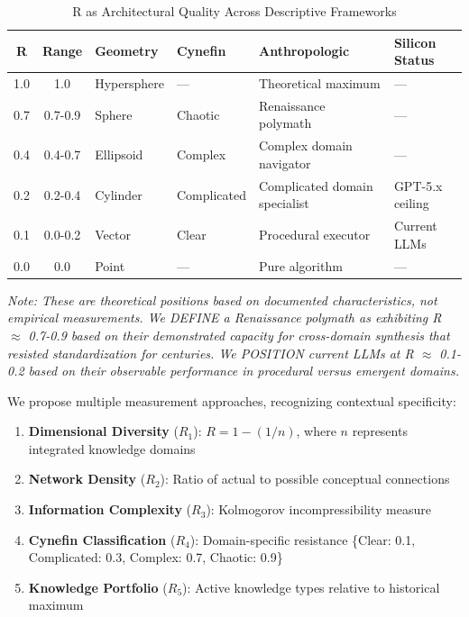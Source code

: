 \begin{table}[h]
\centering
\caption{R as Architectural Quality Across Descriptive Frameworks}
\begin{tabular}{|c|c|l|l|l|l|}
\hline
\textbf{R} & \textbf{Range} & \textbf{Geometry} & \textbf{Cynefin} & \textbf{Anthropologic} & \textbf{Silicon Status} \\
\hline
1.0 & 1.0 & Hypersphere & --- & Theoretical maximum & --- \\
0.7 & 0.7-0.9 & Sphere & Chaotic & Renaissance polymath & --- \\
0.4 & 0.4-0.7 & Ellipsoid & Complex & Complex domain navigator & --- \\
0.2 & 0.2-0.4 & Cylinder & Complicated & Complicated domain specialist & GPT-5.x ceiling \\
0.1 & 0.0-0.2 & Vector & Clear & Procedural executor & Current LLMs \\
0.0 & 0.0 & Point & --- & Pure algorithm & --- \\
\hline
\end{tabular}
\end{table}

\textit{Note: These are theoretical positions based on documented characteristics, not empirical measurements. We DEFINE a Renaissance polymath as exhibiting R $\approx$ 0.7-0.9 based on their demonstrated capacity for cross-domain synthesis that resisted standardization for centuries. We POSITION current LLMs at R $\approx$ 0.1-0.2 based on their observable performance in procedural versus emergent domains.}

We propose multiple measurement approaches, recognizing contextual specificity:

\begin{enumerate}
\item \textbf{Dimensional Diversity} ($R_1$): $R = 1 - (1/n)$, where $n$ represents integrated knowledge domains
\item \textbf{Network Density} ($R_2$): Ratio of actual to possible conceptual connections
\item \textbf{Information Complexity} ($R_3$): Kolmogorov incompressibility measure
\item \textbf{Cynefin Classification} ($R_4$): Domain-specific resistance \{Clear: 0.1, Complicated: 0.3, Complex: 0.7, Chaotic: 0.9\}
\item \textbf{Knowledge Portfolio} ($R_5$): Active knowledge types relative to historical maximum
\end{enumerate}

